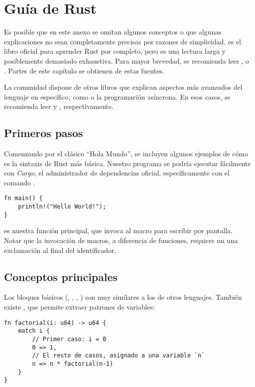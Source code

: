 \chapter{Guía de Rust}\label{annex:rust}

Es posible que en este anexo se omitan algunos conceptos o que algunas
explicaciones no sean completamente precisas por razones de simplicidad.
 es el libro oficial para aprender Rust por completo, pero es
una lectura larga y posiblemente demasiado exhaustiva. Para mayor brevedad, se
recomienda leer ,  o
. Partes de este capítulo se obtienen de estas fuentes.

La comunidad dispone de otros libros que explican aspectos más avanzados del
lenguaje en específico, como \unsafe o la programación asíncrona. En esos casos,
se recomienda leer  y ,
respectivamente.

\section{Primeros pasos}

Comenzando por el clásico ``Hola Mundo'', se incluyen algunos ejemplos de cómo
es la sintaxis de Rust más básica. Nuestro programa se podría ejecutar
fácilmente con \emph{Cargo}, el administrador de dependencias oficial,
específicamente con el comando .

\begin{verbatim}
fn main() {
    println!("Hello World!");
}
\end{verbatim}

 es nuestra función principal, que invoca al macro 
para escribir por pantalla. Notar que la invocación de macros, a diferencia de
funciones, requiere un una exclamación al final del identificador.

\section{Conceptos principales}

Los bloques básicos (, , , ) son muy
similares a los de otros lenguajes. También existe , que permite
extraer patrones de variables:

\begin{verbatim}
fn factorial(i: u64) -> u64 {
    match i {
        // Primer caso: i = 0
        0 => 1,
        // El resto de casos, asignado a una variable `n`
        n => n * factorial(n-1)
    }
}
\end{verbatim}

